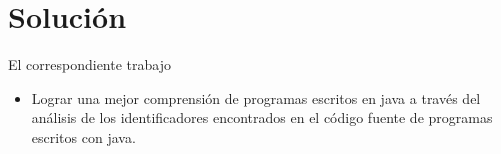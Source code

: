 \documentclass[12pt]{report}
\begin{document}
\section{Solución}

El correspondiente trabajo

\begin{itemize}
\item Lograr una mejor comprensión de programas escritos en java a través del análisis de los identificadores encontrados en el código fuente de programas escritos con java.
\end{itemize}





\end{document}
